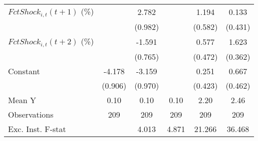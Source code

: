 {\begin{tabular}{l*{5}{c}}
\addlinespace
$ FctShock_{i,t}(t+1)$ (\%)&                     &       2.782\sym{**} &                     &       1.194\sym{*}  &       0.133         \\
                    &                     &     (0.982)         &                     &     (0.582)         &     (0.431)         \\
\addlinespace
$ FctShock_{i,t}(t+2)$ (\%)&                     &      -1.591\sym{*}  &                     &       0.577         &       1.623\sym{***}\\
                    &                     &     (0.765)         &                     &     (0.472)         &     (0.362)         \\
\addlinespace
Constant            &      -4.178\sym{***}&      -3.159\sym{***}&                     &       0.251         &       0.667         \\
                    &     (0.906)         &     (0.970)         &                     &     (0.423)         &     (0.462)         \\
\midrule
Mean Y              &        0.10         &        0.10         &        0.10         &        2.20         &        2.46         \\
Observations        &         209         &         209         &         209         &         209         &         209         \\
Exc. Inst. F-stat   &                     &       4.013         &       4.871         &      21.266         &      36.468         \\
\bottomrule
\end{tabular}
}
